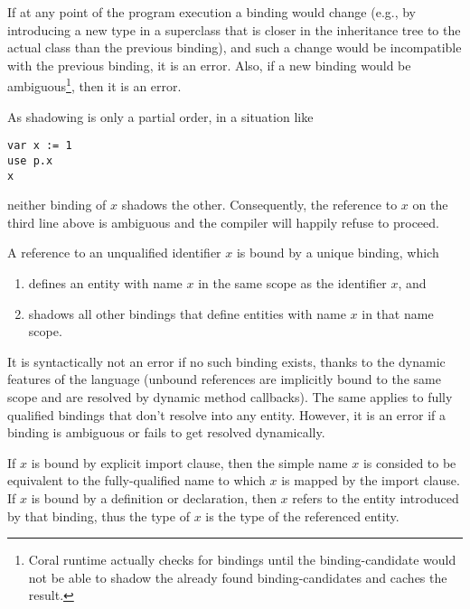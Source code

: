 If at any point of the program execution a binding would change (e.g., by introducing a new type in a superclass that is closer in the inheritance tree to the actual class than the previous binding), and such a change would be incompatible with the previous binding, it is an error. Also, if a new binding would be ambiguous\footnote{Coral runtime actually checks for bindings until the binding-candidate would not be able to shadow the already found binding-candidates and caches the result.}, then it is an error. 

As shadowing is only a partial order, in a situation like

\begin{lstlisting}
var x := 1
use p.x
x
\end{lstlisting}

neither binding of $x$ shadows the other. Consequently, the reference to $x$ on the third line above is ambiguous and the compiler will happily refuse to proceed. 

A reference to an unqualified identifier $x$ is bound by a unique binding, which

\begin{enumerate}
\item defines an entity with name $x$ in the same scope as the identifier $x$, and
\item shadows all other bindings that define entities with name $x$ in that name scope.
\end{enumerate}

It is syntactically not an error if no such binding exists, thanks to the dynamic features of the language (unbound references are implicitly bound to the same scope and are resolved by dynamic method callbacks). The same applies to fully qualified bindings that don't resolve into any entity. However, it is an error if a binding is ambiguous or fails to get resolved dynamically.

If $x$ is bound by explicit \lstinline@use@ import clause, then the simple name $x$ is consided to be equivalent to the fully-qualified name to which $x$ is mapped by the import clause. If $x$ is bound by a definition or declaration, then $x$ refers to the entity introduced by that binding, thus the type of $x$ is the type of the referenced entity. 






